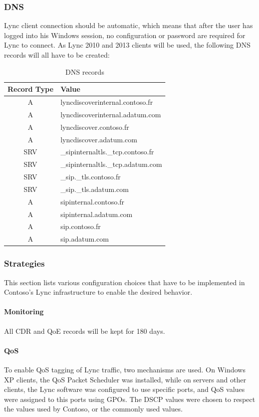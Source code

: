 	\subsubsection{DNS}
	Lync client connection should be automatic, which means that after the user has logged into his Windows session, no configuration or password are required for Lync to connect. As Lync 2010 and 2013 clients will be used, the following DNS records will all have to be created:
	\begin{table}[H]
	\centering
	\begin{tabular}{c|l}
		Record Type & Value \\ \hline 
		A & lyncdiscoverinternal.contoso.fr \\
		A & lyncdiscoverinternal.adatum.com \\
		A & lyncdiscover.contoso.fr \\
		A & lyncdiscover.adatum.com \\
		SRV & \_sipinternaltls.\_tcp.contoso.fr \\
		SRV & \_sipinternaltls.\_tcp.adatum.com \\
		SRV & \_sip.\_tls.contoso.fr \\
		SRV & \_sip.\_tls.adatum.com \\
		A & sipinternal.contoso.fr \\
		A & sipinternal.adatum.com \\
		A & sip.contoso.fr \\ 
		A & sip.adatum.com
	\end{tabular}
	\caption{\label{tab:case_dns} DNS records}
	\end{table}

	

	
	\subsubsection{Strategies}
	
		This section lists various configuration choices that have to be implemented in Contoso's Lync infrastructure to enable the desired behavior.
		
		\paragraph{Monitoring} All CDR and QoE records will be kept for 180 days.
		
		\paragraph{QoS} To enable QoS tagging of Lync traffic, two mechanisms are used. On Windows XP clients, the QoS Packet Scheduler was installed, while on servers and other clients, the Lync software was configured to use specific ports, and QoS values were assigned to this ports using GPOs. The DSCP values were chosen to respect the values used by Contoso, or the commonly used values.
				
